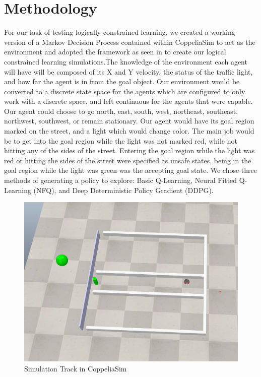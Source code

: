 \documentclass{article}
\begin{document}
\section{Methodology}
For our task of testing logically constrained learning, we created a working version of a Markov Decision Process contained within CoppeliaSim to act as the environment and adopted the framework as seen in \cite{hasanbeig2022lcrl} to create our logical constrained learning simulations.The knowledge of the environment each agent will have will be composed of its X and Y velocity, the status of the traffic light, and how far the agent is in from the goal object. Our environment would be converted to a discrete state space for the agents which are configured to only work with a discrete space, and left continuous for the agents that were capable. Our agent could choose to go north, east, south, west, northeast, southeast, northwest, southwest, or remain stationary. Our agent would have its goal region marked on the street, and a light which would change color. The main job would be to get into the goal region while the light was not marked red, while not hitting any of the sides of the street. Entering the goal region while the light was red or hitting the sides of the street were specified as unsafe states, being in the goal region while the light was green was the accepting goal state. We chose three methods of generating a policy to explore: Basic Q-Learning, Neural Fitted Q-Learning (NFQ), and Deep Deterministic Policy Gradient (DDPG).

\begin{figure}
    \centering
    \includegraphics[keepaspectratio,scale=0.5]{media/track.png}
    \caption{Simulation Track in CoppeliaSim}
    \label{track}
\end{figure}
\end{document}
